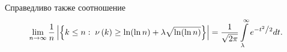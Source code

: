 \begin{remark} 
Справедливо также соотношение
\[
\mathop {\lim }\limits_{n\to \infty } \frac{1}{n}\left| {\left\{ {k\leq n:\;\nu \left( k \right)\ge \ln (\ln n)+\lambda \sqrt {\ln (\ln n)} } 
\right\}} \right|=\frac{1}{\sqrt {2\pi } }\int\limits_\lambda ^\infty 
{e^{-{t^2} \mathord{\left/ {\vphantom {{t^2} 2}} \right. 
\kern-\nulldelimiterspace} 2}dt} .
\]
\end{remark} 


\begin{comment}


\begin{problem}
$V=\left\{ {1,...,m} \right\}$, ${\rm M}=\left\{ {M_1 
,...,M_n } \right\}$, $M_k \subseteq V$.

$\chi :\quad V\to \left\{ {-1,1} \right\}$ (можно интерпретировать, как 
раскраску множества V в два цвета).

$\chi (M_i )=\sum\limits_{a\in M_i } {\chi (a)} $ ($\left| {\chi (M_i )} 
\right|$ отвечает за ``равномерность'' покраски множества $M_i $ в два 
цвета).

$disc({\rm M},\chi )=\mathop {\max }\limits_{i=1..n} \left| {\chi (M_i )} 
\right|$ (от слова discrepancy - уклонение) - мера того, что хотя бы один 
объект в ${\rm M}$ раскрашен ``неравномерно''.

$disc({\rm M})=\mathop {\min }\limits_\chi disc({\rm M},\chi )$(``поиск'' 
наилучшей раскраски).

Показать, что для $\forall n\;\forall m\;\forall {\rm M} \quad disc({\rm M})\le 
\sqrt {2m\ln (2n)} $. Т. е. $\exists \chi :\;disc({\rm M},\chi )\le \sqrt 
{2m\ln (2n)} $.

\end{problem}


\end{comment}





